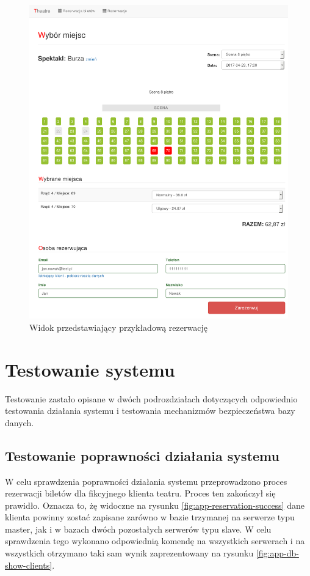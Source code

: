 \documentclass{mgr}
\begin{document}
\begin{figure}[!ht]
	\centering
	\includegraphics[width=\textwidth]{images/stages.png}
	\caption{Widok przedstawiający przykładową rezerwację}
	\label{fig:stages}
\end{figure}

\chapter{Testowanie systemu}
Testowanie zastało opisane w dwóch podrozdziałach dotyczących odpowiednio testowania działania systemu i testowania mechanizmów bezpieczeństwa bazy danych.

\section{Testowanie poprawności działania systemu}
W celu sprawdzenia poprawności działania systemu przeprowadzono proces rezerwacji biletów dla fikcyjnego klienta teatru. Proces ten zakończył się prawidło. Oznacza to, żę widoczne na rysunku \ref{fig:app-reservation-success} dane klienta powinny zostać zapisane zarówno w bazie trzymanej na serwerze typu master, jak i w bazach dwóch pozostałych serwerów typu slave. W celu sprawdzenia tego wykonano odpowiednią komendę na wszystkich serwerach i na wszystkich otrzymano taki sam wynik zaprezentowany na rysunku \ref{fig:app-db-show-clients}.
\end{document}
